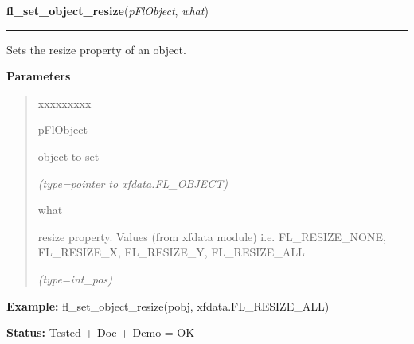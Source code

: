 \hspace{.8\funcindent}\begin{boxedminipage}{\funcwidth}

    \raggedright \textbf{fl\_set\_object\_resize}(\textit{pFlObject}, \textit{what})

    \vspace{-1.5ex}

    \rule{\textwidth}{0.5\fboxrule}
\setlength{\parskip}{2ex}
    Sets the resize property of an object.

\setlength{\parskip}{1ex}
      \textbf{Parameters}
      \vspace{-1ex}

      \begin{quote}
        \begin{Ventry}{xxxxxxxxx}

          \item[pFlObject]

          object to set

            {\it (type=pointer to xfdata.FL\_OBJECT)}

          \item[what]

          resize property. Values (from xfdata module) i.e. 
          FL\_RESIZE\_NONE, FL\_RESIZE\_X, FL\_RESIZE\_Y, FL\_RESIZE\_ALL

            {\it (type=int\_pos)}

        \end{Ventry}

      \end{quote}

\textbf{Example:} fl\_set\_object\_resize(pobj, xfdata.FL\_RESIZE\_ALL)



\textbf{Status:} Tested + Doc + Demo = OK



    \end{boxedminipage}

    \label{xformslib:flbasic:fl_get_object_resize}

    \vspace{0.5ex}

